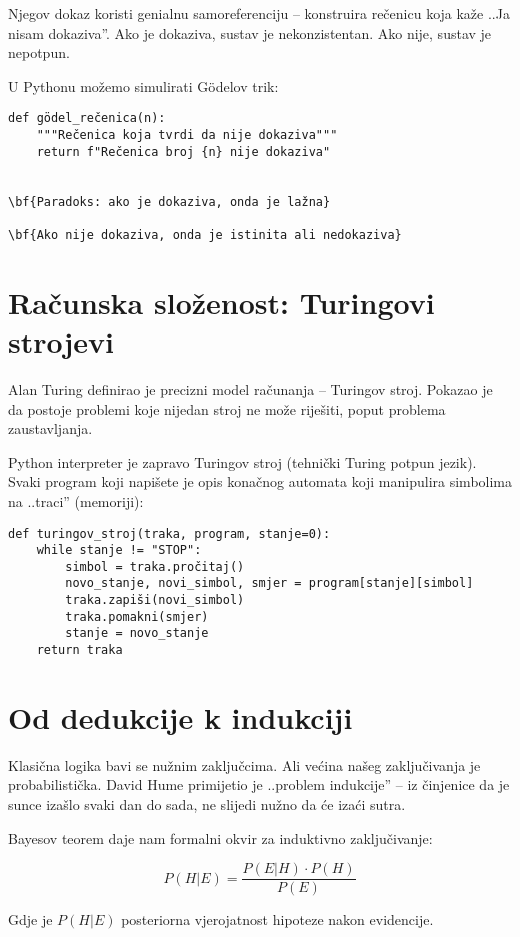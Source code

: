 Njegov dokaz koristi genialnu samoreferenciju -- konstruira rečenicu koja kaže ..Ja nisam dokaziva''. Ako je dokaziva, sustav je nekonzistentan. Ako nije, sustav je nepotpun.


U Pythonu možemo simulirati Gödelov trik:
\begin{verbatim}
def gödel_rečenica(n):
    """Rečenica koja tvrdi da nije dokaziva"""
    return f"Rečenica broj {n} nije dokaziva"


\bf{Paradoks: ako je dokaziva, onda je lažna}

\bf{Ako nije dokaziva, onda je istinita ali nedokaziva}

\end{verbatim}


\section{Računska složenost: Turingovi strojevi}


Alan Turing definirao je precizni model računanja -- Turingov stroj. Pokazao je da postoje problemi koje nijedan stroj ne može riješiti, poput problema zaustavljanja.


Python interpreter je zapravo Turingov stroj (tehnički Turing potpun jezik).
Svaki program koji napišete je opis konačnog automata koji manipulira simbolima na ..traci'' (memoriji):

\begin{verbatim}
def turingov_stroj(traka, program, stanje=0):
    while stanje != "STOP":
        simbol = traka.pročitaj()
        novo_stanje, novi_simbol, smjer = program[stanje][simbol]
        traka.zapiši(novi_simbol)
        traka.pomakni(smjer)
        stanje = novo_stanje
    return traka
\end{verbatim}


\section{Od dedukcije k indukciji}

Klasična logika bavi se nužnim zaključcima. Ali većina našeg zaključivanja je probabilistička. David Hume primijetio je ..problem indukcije'' -- iz činjenice da je sunce izašlo svaki dan do sada, ne slijedi nužno da će izaći sutra.

Bayesov teorem daje nam formalni okvir za induktivno zaključivanje:

$$P(H|E) = \frac{P(E|H) \cdot P(H)}{P(E)}$$


Gdje je $P(H|E)$ posteriorna vjerojatnost hipoteze nakon evidencije.


